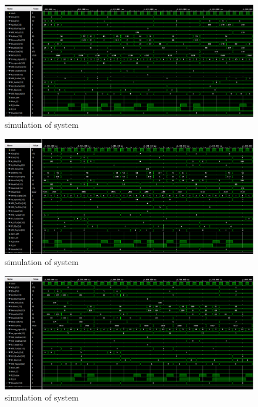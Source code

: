 \documentclass[pdftex,12pt,a4paper]{article}
\begin{document}
\begin{figure}[H]
    \centering
    \includegraphics[width=1\textwidth]{photos/system_result_4.png}	
    \caption{simulation of system}
    \label{implementation}
\end{figure}

\begin{figure}[H]
    \centering
    \includegraphics[width=1\textwidth]{photos/system_result_5.png}	
    \caption{simulation of system}
    \label{implementation}
\end{figure}


\begin{figure}[H]
    \centering
    \includegraphics[width=1\textwidth]{photos/system_result_6.png}	
    \caption{simulation of system}
    \label{implementation}
\end{figure}
\end{document}
